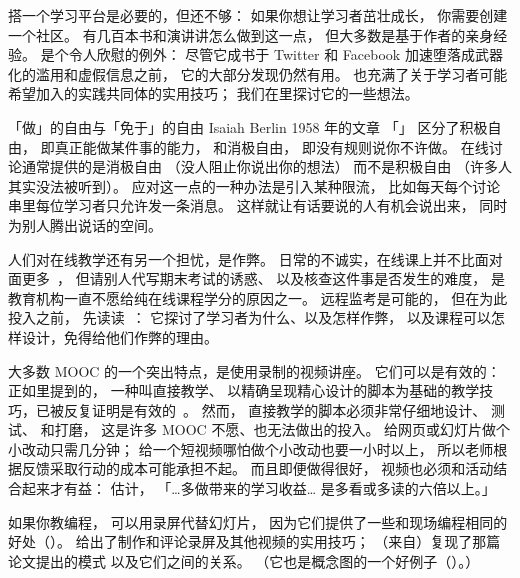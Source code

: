 搭一个学习平台是必要的，但还不够：
如果你想让学习者茁壮成长，
你需要创建一个社区。
有几百本书和演讲讲怎么做到这一点，
但大多数是基于作者的亲身经验。
\cite{Krau2016}是个令人欣慰的例外：
尽管它成书于 Twitter 和 Facebook 加速堕落成武器化的滥用和虚假信息之前，
它的大部分发现仍然有用。
\cite{Foge2005}也充满了关于学习者可能希望加入的实践共同体的实用技巧；
我们在里探讨它的一些想法。

\begin{aside}{「做」的自由与「免于」的自由}
  Isaiah Berlin 1958 年的文章
  「」
  区分了积极自由，
  即真正能做某件事的能力，
  和消极自由，
  即没有规则说你不许做。
  在线讨论通常提供的是消极自由
  （没人阻止你说出你的想法）
  而不是积极自由
  （许多人其实没法被听到）。
  应对这一点的一种办法是引入某种限流，
  比如每天每个讨论串里每位学习者只允许发一条消息。
  这样就让有话要说的人有机会说出来，
  同时为别人腾出说话的空间。
\end{aside}

人们对在线教学还有另一个担忧，是作弊。
日常的不诚实，在线课上并不比面对面更多~\cite{Beck2014}，
但请别人代写期末考试的诱惑、
以及核查这件事是否发生的难度，
是教育机构一直不愿给纯在线课程学分的原因之一。
远程监考是可能的，
但在为此投入之前，
先读读~\cite{Lang2013}：
它探讨了学习者为什么、以及怎样作弊，
以及课程可以怎样设计，免得给他们作弊的理由。


大多数 MOOC 的一个突出特点，是使用录制的视频讲座。
它们可以是有效的：
正如里提到的，
一种叫直接教学、
以精确呈现精心设计的脚本为基础的教学技巧，已被反复证明是有效的~\cite{Stoc2018}。
然而，
直接教学的脚本必须非常仔细地设计、
测试、
和打磨，
这是许多 MOOC 不愿、也无法做出的投入。
给网页或幻灯片做个小改动只需几分钟；
给一个短视频哪怕做个小改动也要一小时以上，
所以老师根据反馈采取行动的成本可能承担不起。
而且即便做得很好，
视频也必须和活动结合起来才有益：
\cite{Koed2015}估计，
「{\ldots}多做带来的学习收益{\ldots}
是多看或多读的六倍以上。」

如果你教编程，
可以用录屏代替幻灯片，
因为它们提供了一些和现场编程相同的好处（）。
\cite{Chen2009}给出了制作和评论录屏及其他视频的实用技巧；
（来自\cite{Chen2009}）复现了那篇论文提出的模式
以及它们之间的关系。
（它也是概念图的一个好例子（）。）


